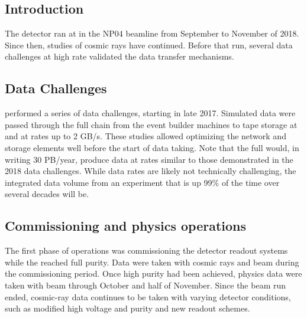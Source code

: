 \subsection{Introduction}

The  detector ran at  in the NP04 beamline from September to November of 2018. Since then, studies of cosmic rays have continued. Before that run, several data challenges at high rate validated the data transfer mechanisms. 

\subsection{Data Challenges}

 performed a series of data challenges, starting in late 2017.  Simulated data were passed through the full chain from the event builder machines to tape storage at  and  at rates up to 2 GB/s.  These studies allowed optimizing the network and storage elements well before the start of data taking.
Note that the full   would, in writing 30 PB/year, produce data at rates similar to  those demonstrated in the 2018 data challenges. While data rates are likely not technically challenging, the integrated data volume from an experiment that is up 99\% of the time over several decades will be. 

\subsection{Commissioning and physics operations}

The first phase of operations was commissioning the detector readout systems while the  reached full purity.  Data were taken with cosmic rays and beam during the commissioning period. Once high  purity had been achieved, physics data were  taken with beam through October and half of November. %
Since the beam run ended, cosmic-ray data continues to be taken with varying detector conditions, such as modified high voltage and purity and new readout schemes. 



